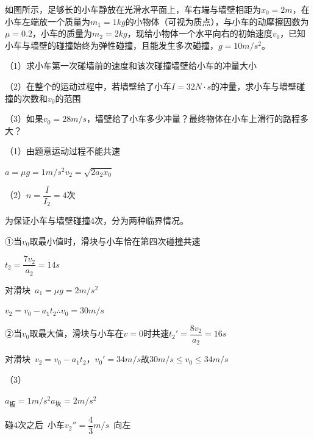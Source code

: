 \begin{problem}[21，15分]
如图所示，足够长的小车静放在光滑水平面上，车右端与墙壁相距为$x_0=2\unit{m}$，在小车左端放一个质量为$m_1=1\unit{kg}$的小物体（可视为质点），与小车的动摩擦因数为$\mu=0.2$，小车的质量为$m_2=2\unit{kg}$，现给小物体一个水平向右的初始速度$v_0$，已知小车与墙壁的碰撞始终为弹性碰撞，且能发生多次碰撞，$g=10\unit{m/s^2}$。

（1）求小车第一次碰墙前的速度和该次碰撞墙壁给小车的冲量大小\ 

（2）在整个的运动过程中，若墙壁给了小车$I=32\unit{N\cdot s}$的冲量，求小车与墙壁碰撞的次数和$v_0$的范围\ 

（3）如果$v_0=28\unit{m/s}$，墙壁给了小车多少冲量？最终物体在小车上滑行的路程多大？\ %
\begin{solution}
（1）由题意运动过程不能共速

$a=\mu g=1\unit{m/s^2}$\quad $v_2=\sqrt{2a_2x_0}$%

（2）$n=\dfrac{I}{I_2}=4$次

为保证小车与墙壁碰撞4次，分为两种临界情况。

①当$v_0$取最小值时，滑块与小车恰在第四次碰撞共速

$t_2=\dfrac{7v_2}{a_2}=14\unit{s}$

对滑块\ $a_1=\mu g=2\unit{m/s^2}$\quad {}\quad {}

$v_2=v_0-a_1t_2$\quad $\therefore v_0=30\unit{m/s}$

②当$v_0$取最大值，滑块与小车在$v=0$时共速\quad $t_2'=\dfrac{8v_2}{a_2}=16\unit{s}$

对滑块\ $v_2=v_0-a_1t_2$，$v_0'=34\unit{m/s}$\quad 故$30\unit{m/s}\le v_0\le34\unit{m/s}$

（3）


$a_{\text{板}}=1\unit{m/s^2}$\quad $a_{\text{块}}=2\unit{m/s^2}$

碰4次之后\ 小车$v_2''=\dfrac{4}{3}\unit{m/s}$\ 向左


\end{solution}
\end{problem}
